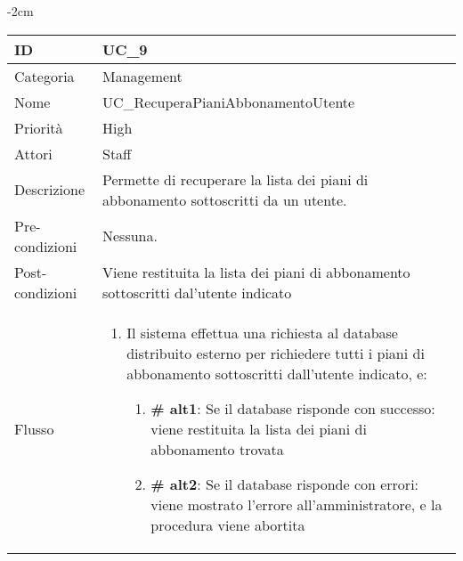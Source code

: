 \begin{center}
\begin{table}[bp]
    \centering
    \addtolength{\leftskip} {-2cm}
\begin{tabular}{ |p{2.6cm}|p{13cm}|  }
\hline
ID & UC\_9 \\\hline
Categoria & Management\\\hline
Nome & UC\_RecuperaPianiAbbonamentoUtente\\\hline
Priorità & High \\\hline
Attori &  Staff \\\hline
Descrizione & Permette di recuperare la lista dei piani di abbonamento sottoscritti da un utente.\\\hline
Pre-condizioni &  Nessuna.\\\hline
Post-condizioni &  Viene restituita la lista dei piani di abbonamento sottoscritti dal'utente indicato\\\hline
Flusso &  	\vspace{-5mm} \begin{enumerate}	
		\item Il sistema effettua una richiesta al database distribuito esterno per richiedere tutti i piani di abbonamento sottoscritti dall'utente indicato, e:
			\begin{enumerate}[  ]
			\item \textbf{\# alt1}: Se il database risponde con successo: viene restituita la lista dei piani di abbonamento trovata
			\item \textbf{\# alt2}: Se il database risponde con errori: viene mostrato l'errore all'amministratore, e la procedura viene abortita
			\end{enumerate}
		\end{enumerate}\\\hline
\end{tabular}
\label{table_use_case:9}\newline
\end{table}



\end{center}
